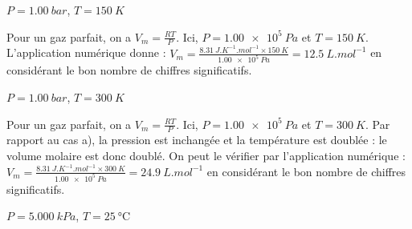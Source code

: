 \debutEntrainement



\begin{enonce}
$P=\SI{1,00}{bar}$, $T=\SI{150}{K}$
\end{enonce}


\begin{corrige}
Pour un gaz parfait, on a $V_m=\frac{RT}{P}$. Ici, $P=\SI{1,00e5}{Pa}$ et $T=\SI{150}{K}$. L'application numérique donne : 
$V_m = \frac{ \SI{8,31}{J.K^{-1}.mol^{-1}}
 \times \SI{150}{K}}{\SI{1,00e5}{Pa}}=\SI{12,5}{L.mol^{-1}}$ en considérant le bon nombre de chiffres significatifs.
\end{corrige}




\begin{enonce}
$P=\SI{1,00}{bar}$, $T=\SI{300}{K}$
\end{enonce}


\begin{corrige}
Pour un gaz parfait, on a $V_m=\frac{RT}{P}$. Ici, $P=\SI{1,00e5}{Pa}$ et $T=\SI{300}{K}$. Par rapport au cas a), la pression est inchangée et la température est doublée : le volume molaire est donc doublé. On peut le vérifier par l'application numérique : $V_m = \frac{ \SI{8,31}{J.K^{-1}.mol^{-1}}
 \times \SI{300}{K}}{\SI{1,00e5}{Pa}}=\SI{24,9}{L.mol^{-1}}$ en considérant le bon nombre de chiffres significatifs.
\end{corrige}




\begin{enonce}
$P=\SI{5,000}{kPa}$, $T=\SI{25}{\celsius}$
\end{enonce}

